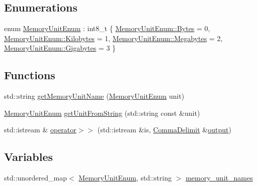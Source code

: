 \subsection*{Enumerations}
\begin{DoxyCompactItemize}
\item 
enum \hyperlink{namespacevt_1_1util_1_1memory_a64df3d84293b34009f78e2a1db2f9bb6}{Memory\+Unit\+Enum} \+: int8\+\_\+t \{ \hyperlink{namespacevt_1_1util_1_1memory_a64df3d84293b34009f78e2a1db2f9bb6a600e754f49b68aa0fc90a9cd64eb7051}{Memory\+Unit\+Enum\+::\+Bytes} = 0, 
\hyperlink{namespacevt_1_1util_1_1memory_a64df3d84293b34009f78e2a1db2f9bb6aa3a6c675a174320497f3bed7e8dc3329}{Memory\+Unit\+Enum\+::\+Kilobytes} = 1, 
\hyperlink{namespacevt_1_1util_1_1memory_a64df3d84293b34009f78e2a1db2f9bb6a2276a1b157f2813f3b65d04c0b1c56f6}{Memory\+Unit\+Enum\+::\+Megabytes} = 2, 
\hyperlink{namespacevt_1_1util_1_1memory_a64df3d84293b34009f78e2a1db2f9bb6af6f7ad0fd5914138fb449b9011c8de7a}{Memory\+Unit\+Enum\+::\+Gigabytes} = 3
 \}
\end{DoxyCompactItemize}
\subsection*{Functions}
\begin{DoxyCompactItemize}
\item 
std\+::string \hyperlink{namespacevt_1_1util_1_1memory_a6a1de4e8806e74e6e0ef92e4262b654b}{get\+Memory\+Unit\+Name} (\hyperlink{namespacevt_1_1util_1_1memory_a64df3d84293b34009f78e2a1db2f9bb6}{Memory\+Unit\+Enum} unit)
\item 
\hyperlink{namespacevt_1_1util_1_1memory_a64df3d84293b34009f78e2a1db2f9bb6}{Memory\+Unit\+Enum} \hyperlink{namespacevt_1_1util_1_1memory_aeceb7d7ac924dd3d88a58eab5ebf64f7}{get\+Unit\+From\+String} (std\+::string const \&unit)
\item 
std\+::istream \& \hyperlink{namespacevt_1_1util_1_1memory_afe1acbbca9aa1bd7310548cefd40045c}{operator$>$$>$} (std\+::istream \&is, \hyperlink{structvt_1_1util_1_1memory_1_1_comma_delimit}{Comma\+Delimit} \&\hyperlink{namespacevt_ad3ca3e8710dd3c8badff897f8de3c858}{output})
\end{DoxyCompactItemize}
\subsection*{Variables}
\begin{DoxyCompactItemize}
\item 
std\+::unordered\+\_\+map$<$ \hyperlink{namespacevt_1_1util_1_1memory_a64df3d84293b34009f78e2a1db2f9bb6}{Memory\+Unit\+Enum}, std\+::string $>$ \hyperlink{namespacevt_1_1util_1_1memory_aa772e07fd4860ed4086654c53eed51c2}{memory\+\_\+unit\+\_\+names}
\end{DoxyCompactItemize}


